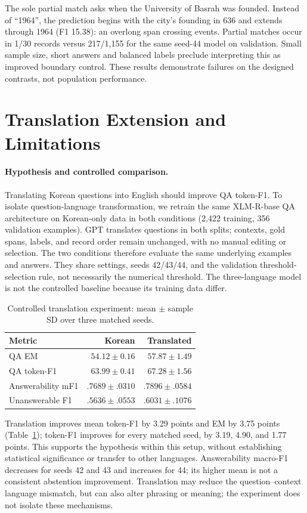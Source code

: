 \documentclass[11pt]{article}
\begin{document}
The sole partial match asks when the University of Basrah was founded. Instead of ``1964'', the prediction begins with the city's founding in 636 and extends through 1964 (F1 15.38): an overlong span crossing events. Partial matches occur in 1/30 records versus 217/1,155 for the same seed-44 model on validation. Small sample size, short answers and balanced labels preclude interpreting this as improved boundary control. These results demonstrate failures on the designed contrasts, not population performance.

\section{Translation Extension and Limitations}
\paragraph{Hypothesis and controlled comparison.}
Translating Korean questions into English should improve QA token-F1. To isolate question-language transformation, we retrain the same XLM-R-base QA architecture on Korean-only data in both conditions (2,422 training, 356 validation examples). GPT translates questions in both splits; contexts, gold spans, labels, and record order remain unchanged, with no manual editing or selection. The two conditions therefore evaluate the same underlying examples and answers. They share settings, seeds 42/43/44, and the validation threshold-selection rule, not necessarily the numerical threshold. The three-language model is not the controlled baseline because its training data differ.

\begin{table}[t]
\small\centering
\begin{tabular}{lrr}
\toprule
Metric & Korean & Translated\\
\midrule
QA EM & $54.12\pm0.16$ & $57.87\pm1.49$\\
QA token-F1 & $63.99\pm0.41$ & $67.28\pm1.56$\\
Answerability mF1 & $.7689\pm.0310$ & $.7896\pm.0584$\\
Unanswerable F1 & $.5636\pm.0553$ & $.6031\pm.1076$\\
\bottomrule
\end{tabular}
\caption{Controlled translation experiment: mean $\pm$ sample SD over three matched seeds.}
\label{tab:extension}
\end{table}

Translation improves mean token-F1 by 3.29 points and EM by 3.75 points (Table~\ref{tab:extension}); token-F1 improves for every matched seed, by 3.19, 4.90, and 1.77 points. This supports the hypothesis within this setup, without establishing statistical significance or transfer to other languages. Answerability macro-F1 decreases for seeds 42 and 43 and increases for 44; its higher mean is not a consistent abstention improvement. Translation may reduce the question--context language mismatch, but can also alter phrasing or meaning; the experiment does not isolate these mechanisms.
\end{document}
